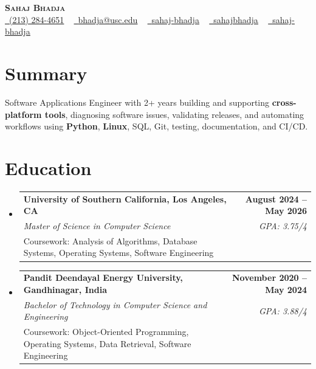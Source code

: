 \documentclass[letterpaper,10pt]{article}
\makeatletter
\newcommand{\sectionGap}{\vspace{-8pt}}
\newcommand{\resumeEduSubheading}[5]{\vspace{-1pt}\item\begin{tabular*}{1.0\textwidth}[t]{l@{\extracolsep{\fill}}r}\textbf{#1} & \textbf{\small #2} \\\textit{\small #3} & \textit{\small #4} \\\small #5 & \\\end{tabular*}\vspace{-4pt}}
\newcommand{\resumeSubHeadingListStart}{\begin{itemize}[leftmargin=0.0in, label={}]}
\newcommand{\resumeSubHeadingListEnd}{\end{itemize}}
\makeatother
\begin{document}
\begin{center}
{\Huge \scshape \textbf{Sahaj Bhadja}} \\ \vspace{1pt}
\small \href{tel:2132844651}{\faPhone\ \underline{(213) 284-4651}} ~ \href{mailto:bhadja@usc.edu}{\raisebox{-0.2\height}\faEnvelope\ \underline{bhadja@usc.edu}} ~
\href{https://www.linkedin.com/in/sahaj-bhadja/}{\raisebox{-0.2\height}\faLinkedin\ \underline{sahaj-bhadja}} ~ \href{https://github.com/SAHAJ-BHADJA}{\raisebox{-0.2\height}\faGithub\ \underline{sahajbhadja}} ~
\href{https://sahaj-bhadja.vercel.app/}{\raisebox{-0.2\height}\faGlobe\ \underline{sahaj-bhadja}}
\end{center}
\vspace{-16pt}
\section{Summary}
\begin{itemize}[leftmargin=0.15in, label={}]
\small{\item{Software Applications Engineer with 2+ years building and supporting \textbf{cross-platform tools}, diagnosing software issues, validating releases, and automating workflows using \textbf{Python}, \textbf{Linux}, SQL, Git, testing, documentation, and CI/CD.}}
\end{itemize}
\sectionGap
\section{Education}
\resumeSubHeadingListStart
\resumeEduSubheading{University of Southern California, Los Angeles, CA}{August 2024 -- May 2026}{Master of Science in Computer Science}{GPA: 3.75/4}{Coursework: Analysis of Algorithms, Database Systems, Operating Systems, Software Engineering}
\resumeEduSubheading{Pandit Deendayal Energy University, Gandhinagar, India}{November 2020 -- May 2024}{Bachelor of Technology in Computer Science and Engineering}{GPA: 3.88/4}{Coursework: Object-Oriented Programming, Operating Systems, Data Retrieval, Software Engineering}
\resumeSubHeadingListEnd
\sectionGap
\end{document}
